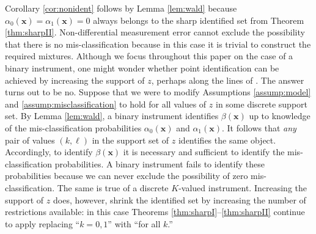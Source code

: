 Corollary \ref{cor:nonident} follows by Lemma \ref{lem:wald} because $\alpha_0(\mathbf{x})=\alpha_1(\mathbf{x})=0$ always belongs to the sharp identified set from Theorem \ref{thm:sharpII}.
Non-differential measurement error cannot exclude the possibility that there is no mis-classification because in this case it is trivial to construct the required mixtures.
Although we focus throughout this paper on the case of a binary instrument, one might wonder whether point identification can be achieved by increasing the support of $z$, perhaps along the lines of \cite{Lewbel}.
The answer turns out to be no.
Suppose that we were to modify Assumptions \ref{assump:model} and \ref{assump:misclassification} to hold for all values of $z$ in some discrete support set.
By Lemma \ref{lem:wald}, a binary instrument identifies $\beta(\mathbf{x})$ up to knowledge of the mis-classification probabilities $\alpha_0(\mathbf{x})$ and $\alpha_1(\mathbf{x})$.
It follows that \emph{any} pair of values $(k,\ell)$ in the support set of $z$ identifies the same object.
Accordingly, to identify $\beta(\mathbf{x})$ it is necessary and sufficient to identify the mis-classification probabilities.
A binary instrument fails to identify these probabilities because we can never exclude the possibility of zero mis-classification.
The same is true of a discrete $K$-valued instrument. 
Increasing the support of $z$ does, however, shrink the identified set by increasing the number of restrictions available: in this case Theorems \ref{thm:sharpI}--\ref{thm:sharpII} continue to apply replacing ``$k=0,1$'' with ``for all $k$.''





